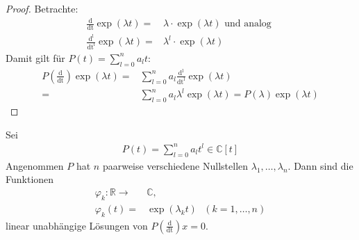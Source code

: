 \begin{proof}
	Betrachte: 
	\begin{align*}
		\frac{\mathrm{d}}{\mathrm{dt}} \exp(\lambda t) = &  
			\lambda \cdot \exp(\lambda t) \text{ und analog } \\
		\frac{\mathrm{d^l}}{\mathrm{dt^l}} \exp(\lambda t)  
				= & \lambda^l \cdot \exp(\lambda t)
\end{align*}		
	Damit gilt für  $P(t) =\sum_{l=0}^n a_l t $:
	\begin{align*}
		P\left(\frac{\mathrm{d}}{\mathrm{dt}}\right) \exp(\lambda t) = &
		\sum_{l=0}^n a_l \frac{\mathrm{d^l}}{\mathrm{dt^l}}\exp(\lambda t) \\ 
		= & \sum_{l= 0}^n a_l \lambda^l \exp(\lambda t)
		= P(\lambda) \exp(\lambda t)
	\end{align*}
\end{proof}

\begin{Satz}{\label{satz:lsg_homog_dgl_n_ter_grad}
	Sei 
	\begin{align*}
		P(t) = \sum_{l=0}^n a_l t^l \in \mathbb{C}[t]
	\end{align*}
	Angenommen $P$ hat $n$ paarweise verschiedene Nullstellen 
	$\lambda_1, \hdots, \lambda_n$. Dann sind die Funktionen
	\begin{align*}
		\varphi_k : \mathbb{R} \rightarrow & \mathbb{C}, \\
		\varphi_k(t) = & \exp(\lambda_k t) \text{ } (k = 1, \hdots, n)
	\end{align*}
	linear unabhängige Lösungen von $P\left(\frac{\mathrm{d}}{\mathrm{dt}}\right) x = 0$.
}\end{Satz}

